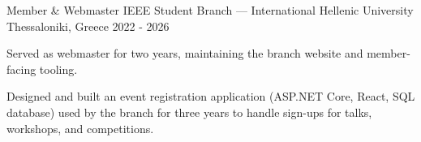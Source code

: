 

\begin{cventries}

  \cventry
    {Member \& Webmaster} %
    {IEEE Student Branch --- International Hellenic University} %
    {Thessaloniki, Greece} %
    {2022 - 2026} %
    {
      \begin{cvitems} %
        \item {Served as webmaster for two years, maintaining the branch website and member-facing tooling.}
        \item {Designed and built an event registration application (ASP.NET Core, React, SQL database) used by the branch for three years to handle sign-ups for talks, workshops, and competitions.}
      \end{cvitems}
    }

\end{cventries}
